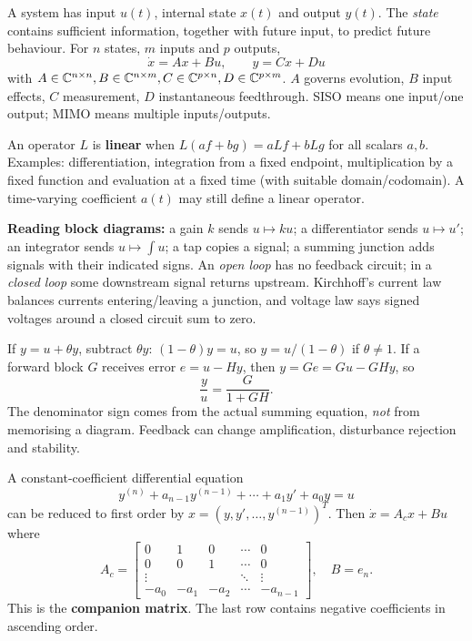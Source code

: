 \documentclass[10pt,a4paper]{article}
\begin{document}
\begin{defbox}A system has input $u(t)$, internal state $x(t)$ and output $y(t)$. The \emph{state} contains sufficient information, together with future input, to predict future behaviour. For $n$ states, $m$ inputs and $p$ outputs,
\[\boxed{\dot x=Ax+Bu,\qquad y=Cx+Du}\]
with $A\in\mathbb{C}^{n\times n}, B\in\mathbb{C}^{n\times m}, C\in\mathbb{C}^{p\times n}, D\in\mathbb{C}^{p\times m}$. $A$ governs evolution, $B$ input effects, $C$ measurement, $D$ instantaneous feedthrough. SISO means one input/one output; MIMO means multiple inputs/outputs.
\end{defbox}
\begin{formbox}An operator $L$ is \textbf{linear} when $L(af+bg)=aLf+bLg$ for all scalars $a,b$. Examples: differentiation, integration from a fixed endpoint, multiplication by a fixed function and evaluation at a fixed time (with suitable domain/codomain). A time-varying coefficient $a(t)$ may still define a linear operator.\end{formbox}
\begin{defbox}\textbf{Reading block diagrams:} a gain $k$ sends $u\mapsto ku$; a differentiator sends $u\mapsto u'$; an integrator sends $u\mapsto\int u$; a tap copies a signal; a summing junction adds signals with their indicated signs. An \emph{open loop} has no feedback circuit; in a \emph{closed loop} some downstream signal returns upstream. Kirchhoff's current law balances currents entering/leaving a junction, and voltage law says signed voltages around a closed circuit sum to zero.\end{defbox}
\begin{workbox}[title={WORKED: positive vs negative feedback}]
If $y=u+\theta y$, subtract $\theta y$: $(1-\theta)y=u$, so $\boxed{y=u/(1-\theta)}$ if $\theta\ne1$. If a forward block $G$ receives error $e=u-Hy$, then $y=Ge=Gu-GHy$, so
\[\boxed{\frac yu=\frac{G}{1+GH}}.\]
The denominator sign comes from the actual summing equation, \emph{not} from memorising a diagram. Feedback can change amplification, disturbance rejection and stability.
\end{workbox}
\begin{formbox}A constant-coefficient differential equation
\[y^{(n)}+a_{n-1}y^{(n-1)}+\cdots+a_1 y'+a_0y=u\]
can be reduced to first order by $x=(y,y',\ldots,y^{(n-1)})^T$. Then $\dot x=A_cx+Bu$ where
\[A_c=\begin{bmatrix}0&1&0&\cdots&0\\0&0&1&\cdots&0\\\vdots&&&\ddots&\vdots\\-a_0&-a_1&-a_2&\cdots&-a_{n-1}\end{bmatrix},\quad B=e_n.\]
This is the \textbf{companion matrix}. The last row contains negative coefficients in ascending order.
\end{formbox}
\end{document}
